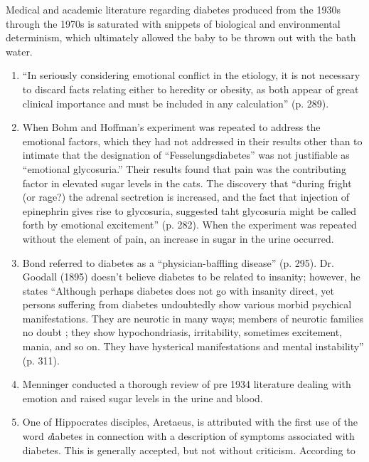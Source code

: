 \documentclass[12pt]{article}
\begin{document}
Medical and academic literature regarding diabetes produced from the 1930s through the 1970s is saturated with snippets of biological and environmental determinism, which ultimately allowed the baby to be thrown out with the bath water.  

\begin{enumerate}
\item \citep{daniels_role_1948}
``In seriously considering emotional conflict in the etiology, it is not necessary to discard facts relating either to heredity or obesity, as both appear of great clinical importance and must be included in any calculation'' (p. 289). 
\item \citep{cannon_1916_bodily}
When Bohm and Hoffman's experiment was repeated to address the emotional factors, which they had not addressed in their results other than to intimate that the designation of ``Fesselungsdiabetes'' was not justifiable as ``emotional glycosuria.'' Their results found that pain was the contributing factor in elevated sugar levels in the cats. The discovery that ``during fright (or rage?) the adrenal sectretion is increased, and the fact that injection of epinephrin gives rise to glycosuria, suggested taht glycosuria might be called forth by emotional excitement'' (p. 282). When the experiment was repeated without the element of pain, an increase in sugar in the urine occurred. 

\item \citep{bond_1895_relation}
Bond referred to diabetes as a ``physician-baffling disease'' (p. 295).
Dr. Goodall (1895) doesn't believe diabetes to be related to insanity; however, he states ``Although perhaps diabetes does not go with insanity direct, yet persons suffering from diabetes undoubtedly show
various morbid psychical manifestations. They are neurotic in many ways; members of neurotic families no doubt ; they show hypochondriasis, irritability, sometimes excitement, mania, and so on. They have hysterical manifestations and mental instability'' (p. 311). 

\item \citep{menninger_1935_psychological} Menninger conducted a thorough review of pre 1934 literature dealing with emotion and raised sugar levels in the urine and blood. 

\item \citep{major_1933_classic}
One of Hippocrates disciples, Aretaeus, is attributed with the first use of the word \textit diabetes in connection with a description of symptoms associated with diabetes. This is generally accepted, but not without criticism. According to



\end{enumerate}
\end{document}
